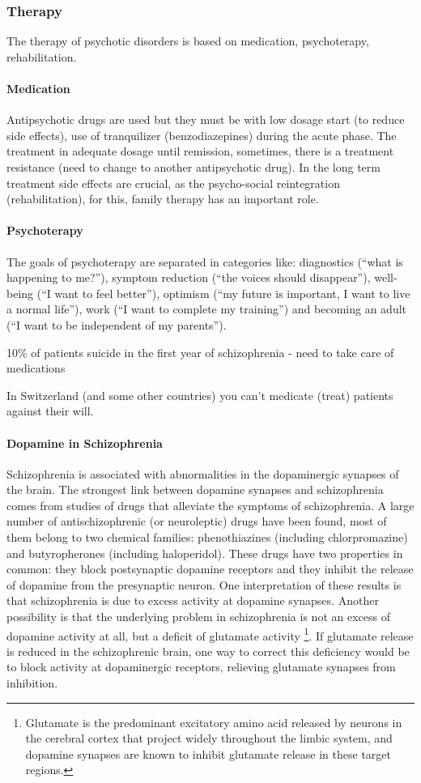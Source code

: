 \documentclass[12pt,article,oneside,a4paper]{memoir}
\begin{document}
\subsubsection{Therapy}
The therapy of psychotic disorders is based on medication, psychoterapy,
rehabilitation.

\paragraph{Medication}
Antipsychotic drugs are used but they must be with low dosage start (to reduce
side effects), use of tranquilizer (benzodiazepines) during the acute phase. The
treatment in adequate dosage until remission, sometimes, there is a treatment
resistance (need to change to another antipsychotic drug).
In the long term treatment side effects are crucial, as the psycho-social
reintegration (rehabilitation), for this, family therapy has an important role.

\paragraph{Psychoterapy}
The goals of psychoterapy are separated in categories like: diagnostics (``what
is happening to me?''), symptom reduction (``the voices should disappear''), 
well-being (``I want to feel better''), optimism (``my future is important, I 
want to live a normal life''), work (``I want to complete my training'') and 
becoming an adult (``I want to be independent of my parents'').

10\% of patients suicide in the first year of schizophrenia - need to take care
of medications

In Switzerland (and some other countries) you can't medicate (treat) patients
against their will.

\paragraph{Dopamine in Schizophrenia}
Schizophrenia is associated with abnormalities in the dopaminergic synapses of
the brain. The strongest link between dopamine synapses and schizophrenia comes
from studies of drugs that alleviate the symptoms of schizophrenia.
A large number of antischizophrenic (or neuroleptic) drugs have been found,
most of them belong to two chemical families: phenothiazines (including
chlorpromazine) and butyropherones (including haloperidol). These drugs have two
properties in common: they block postsynaptic dopamine receptors and they
inhibit the release of dopamine from the presynaptic neuron. One interpretation
of these results is that schizophrenia is due to excess activity at dopamine
synapses. Another possibility is that the underlying problem in schizophrenia
is not an excess of dopamine activity at all, but a deficit of glutamate activity
\footnote{Glutamate is the predominant excitatory amino acid released by neurons
in the cerebral cortex that project widely throughout the limbic system, and
dopamine synapses are known to inhibit glutamate release in these target regions.}.
If glutamate release is reduced in the schizophrenic brain, one way to correct
this deficiency would be to block activity at dopaminergic receptors, relieving
glutamate synapses from inhibition.
\end{document}
